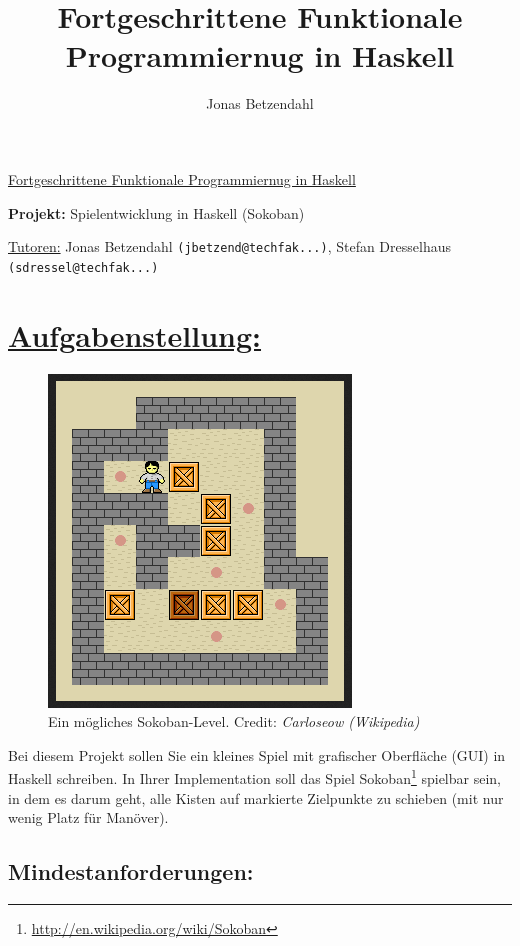 \documentclass[10pt,a4paper]{article}
\author{Jonas Betzendahl}
\title{Fortgeschrittene Funktionale Programmiernug in Haskell}
\begin{document}
\huge \underline{Fortgeschrittene Funktionale Programmiernug in Haskell}\smallskip

\Large
\begin{center}
\textbf{Projekt:} Spielentwicklung in Haskell (Sokoban)\bigskip

\normalsize
\underline{Tutoren:}
Jonas Betzendahl \texttt{(jbetzend@techfak...)},
Stefan Dresselhaus \texttt{(sdressel@techfak...)}
\end{center}
\normalsize

\section*{\underline{Aufgabenstellung:}}

\begin{figure}
  \vspace{-30pt}
  \begin{center}
    \includegraphics[scale=0.5]{sokoban.png} 
  \end{center}
  \vspace{-15pt}
  \caption{Ein mögliches Sokoban-Level. Credit: \emph{Carloseow (Wikipedia)}}
  \vspace{-90pt}
\end{figure}

Bei diesem Projekt sollen Sie ein kleines Spiel mit grafischer Oberfläche (GUI) in Haskell schreiben. In Ihrer Implementation soll das Spiel Sokoban\footnote{\url{http://en.wikipedia.org/wiki/Sokoban}} spielbar sein, in dem es darum geht, alle Kisten auf markierte Zielpunkte zu schieben (mit nur wenig Platz für Manöver).

\subsection*{Mindestanforderungen:}
\end{document}
